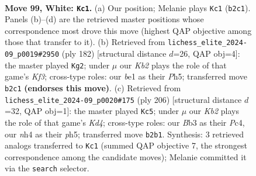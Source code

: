 \documentclass[11pt]{article}
\begin{document}
\clearpage

\begin{figure}[p]\centering
\begin{subfigure}{0.46\textwidth}\centering
\resizebox{\linewidth}{!}{%
\newchessgame
\chessboard[
  setfen={8/1Nn5/7k/8/Pp2P2n/1B2p3/1K5p/4b3 w - - 6 99},
  showmover=false,
  pgfstyle=straightmove, color=movearrow, markmove={b2-c1}
]}
\caption{}
\end{subfigure}\hfill
\begin{subfigure}{0.46\textwidth}\centering
\resizebox{\linewidth}{!}{%
\newchessgame
\chessboard[
  setfen={8/4k1p1/8/5p1P/2P2P2/1nn1BK2/8/8 w - - 1 92},
  showmover=false,
  pgfstyle=straightmove, color=movearrow, markmove={f3-g2}
]}
\caption{}
\end{subfigure}
\\[4pt]
\begin{subfigure}{0.46\textwidth}\centering
\resizebox{\linewidth}{!}{%
\newchessgame
\chessboard[
  setfen={b7/2B5/P3k1p1/7p/2PK3P/5p2/5P2/8 w - - 77 104},
  showmover=false,
  pgfstyle=straightmove, color=movearrow, markmove={d4-c5}
]}
\caption{}
\end{subfigure}\hfill

\caption{\textbf{Move 99, White: \texttt{Kc1}.} (a) Our position; Melanie plays \texttt{Kc1} (\texttt{b2c1}). Panels (b)--(d) are the retrieved master positions whose correspondence most drove this move (highest QAP objective among those that transfer to it). (b) Retrieved from \texttt{lichess\_elite\_2024-09\_p0019\#2950} (ply 182) [structural distance $d$=26, QAP obj=4]: the master played \texttt{Kg2}; under $\mu$ our \emph{Kb2} plays the role of that game's \emph{Kf3}; cross-type roles: our \emph{b}e1 as their \emph{P}h5; transferred move \texttt{b2c1} \textbf{(endorses this move)}. (c) Retrieved from \texttt{lichess\_elite\_2024-09\_p0020\#175} (ply 206) [structural distance $d$=32, QAP obj=1]: the master played \texttt{Kc5}; under $\mu$ our \emph{Kb2} plays the role of that game's \emph{Kd4}; cross-type roles: our \emph{B}b3 as their \emph{P}c4, our \emph{n}h4 as their \emph{p}h5; transferred move \texttt{b2b1}. Synthesis: 3 retrieved analogs transferred to \texttt{Kc1} (summed QAP objective 7, the strongest correspondence among the candidate moves); Melanie committed it via the \texttt{search} selector.}
\label{fig:thought-m196}
\end{figure}

\clearpage
\end{document}
